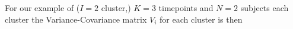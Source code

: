 \documentclass{article}
\begin{document}
For our example of ($I=2$ cluster,) $K=3$ timepoints and $N=2$ subjects each cluster the Variance-Covariance matrix $V_i$ for each cluster is then

\end{document}
